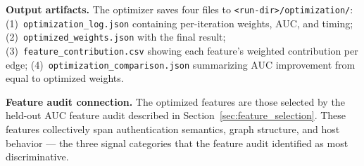 \textbf{Output artifacts.}
The optimizer saves four files to \texttt{<run-dir>/optimization/}: (1)~\texttt{optimization\_log.json} containing per-iteration weights, AUC, and timing; (2)~\texttt{optimized\_weights.json} with the final result; (3)~\texttt{feature\_contribution.csv} showing each feature's weighted contribution per edge; (4)~\texttt{optimization\_comparison.json} summarizing AUC improvement from equal to optimized weights.

\textbf{Feature audit connection.}
The optimized features are those selected by the held-out AUC feature audit described in Section~\ref{sec:feature_selection}. These features collectively span authentication semantics, graph structure, and host behavior --- the three signal categories that the feature audit identified as most discriminative.
